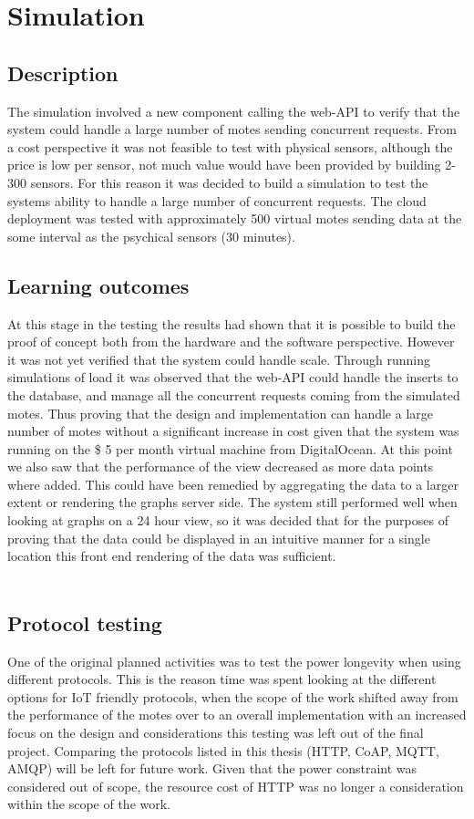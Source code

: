 \documentclass[]{uiophd}
\begin{document}
\section{Simulation}
\subsection{Description}
The simulation involved a new component calling the web-API to verify that the system could handle a large number of motes sending concurrent requests. From a cost perspective it was not feasible to test with physical sensors, although the price is low per sensor, not much value would have been provided by building 2-300 sensors. For this reason it was decided to build a simulation to test the systems ability to handle a large number of concurrent requests. The cloud deployment was tested with approximately 500 virtual motes sending data at the some interval as the psychical sensors (30 minutes). 
\subsection{Learning outcomes}
At this stage in the testing the results had shown that it is possible to build the proof of concept both from the hardware and the software perspective. However it was not yet verified that the system could handle scale. Through running simulations of load it was observed that the web-API could handle the inserts to the database, and manage all the concurrent requests coming from the simulated motes. Thus proving that the design and implementation can handle a large number of motes without a significant increase in cost given that the system was running on the \$ 5 per month virtual machine from DigitalOcean. At this point we also saw that the performance of the view decreased as more data points where added. This could have been remedied by aggregating the data to a larger extent or rendering the graphs server side. The system still performed well when looking at graphs on a 24 hour view, so it was decided that for the purposes of proving that the data could be displayed in an intuitive manner for a single location this front end rendering of the data was sufficient.
\\\\
\subsection{Protocol testing}
One of the original planned activities was to test the power longevity when using different protocols. This is the reason time was spent looking at the different options for IoT friendly protocols, when the scope of the work shifted away from the performance of the motes over to an overall implementation with an increased focus on the design and considerations this testing was left out of the final project. Comparing the protocols listed in this thesis (HTTP, CoAP, MQTT, AMQP) will be left for future work. Given that the power constraint was considered out of scope, the resource cost of HTTP was no longer a consideration within the scope of the work.
\end{document}
